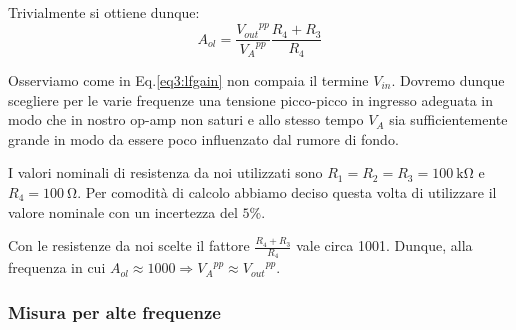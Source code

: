 Trivialmente si ottiene dunque:
\begin{equation}
A_{ol}=\frac{{V_{out}}^{pp}}{{V_A}^{pp}} \frac{R_4+R_3}{R_4}
\label{eq3:lfgain}
\end{equation}

Osserviamo come in Eq.\ref{eq3:lfgain} non compaia il termine $V_{in}$. Dovremo dunque scegliere per le varie frequenze una tensione picco-picco in ingresso adeguata in modo che in nostro op-amp non saturi e allo stesso tempo $V_A$ sia sufficientemente grande in modo da essere poco influenzato dal rumore di fondo. 

I valori nominali di resistenza da noi utilizzati sono $R_1=R_2=R_3=\SI{100}{\kilo\ohm}$ e $R_4=\SI{100}{\ohm}$. Per comodità di calcolo abbiamo deciso questa volta di utilizzare il valore nominale con un incertezza del $5\%$. 

Con le resistenze da noi scelte il fattore $\frac{R_4+R_3}{R_4}$ vale circa 1001. Dunque, alla frequenza in cui $A_{ol} \approx 1000 \Rightarrow {V_A}^{pp} \approx {V_{out}}^{pp}$. 




\subsubsection{Misura per alte frequenze}





